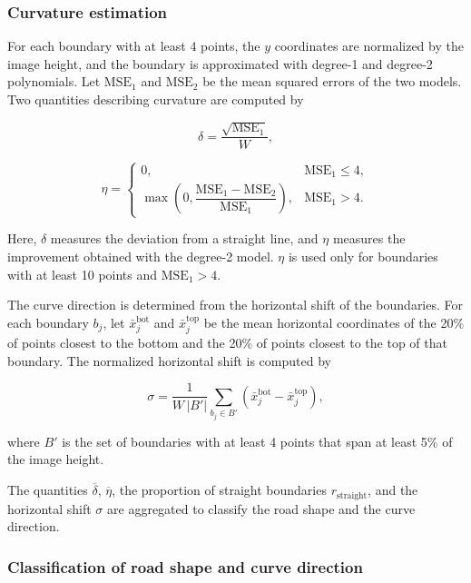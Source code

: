 \documentclass[12pt,a4paper]{report}
\begin{document}
\subsubsection*{Curvature estimation}

For each boundary with at least 4 points, the $y$ coordinates are normalized by the image height, and the boundary is approximated with degree-1 and degree-2 polynomials. Let $\mathrm{MSE}_1$ and $\mathrm{MSE}_2$ be the mean squared errors of the two models. Two quantities describing curvature are computed by

\begin{equation}
\delta=\frac{\sqrt{\mathrm{MSE}_1}}{W},
\label{eq:3.11}
\end{equation}

\begin{equation}
\eta=
\begin{cases}
0, & \mathrm{MSE}_1\leq4,\\[4pt]
\max\left(0,\dfrac{\mathrm{MSE}_1-\mathrm{MSE}_2}{\mathrm{MSE}_1}\right),
& \mathrm{MSE}_1>4.
\end{cases}
\label{eq:3.12}
\end{equation}

Here, $\delta$ measures the deviation from a straight line, and $\eta$ measures the improvement obtained with the degree-2 model. $\eta$ is used only for boundaries with at least 10 points and $\mathrm{MSE}_1>4$.

The curve direction is determined from the horizontal shift of the boundaries. For each boundary $b_j$, let $\bar{x}_j^{\mathrm{bot}}$ and $\bar{x}_j^{\mathrm{top}}$ be the mean horizontal coordinates of the 20\% of points closest to the bottom and the 20\% of points closest to the top of that boundary. The normalized horizontal shift is computed by

\begin{equation}
\sigma=\frac{1}{W\,|B'|}\sum_{b_j\in B'}\left(\bar{x}_j^{\mathrm{bot}}-\bar{x}_j^{\mathrm{top}}\right),
\label{eq:3.13}
\end{equation}

where $B'$ is the set of boundaries with at least 4 points that span at least 5\% of the image height.

The quantities $\overline{\delta}$, $\overline{\eta}$, the proportion of straight boundaries $r_{\mathrm{straight}}$, and the horizontal shift $\sigma$ are aggregated to classify the road shape and the curve direction.

\subsubsection*{Classification of road shape and curve direction}
\end{document}
